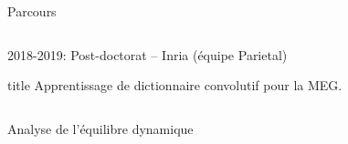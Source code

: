 \documentclass{beamer}
\begin{document}
\begin{frame}[t]{Parcours}
\begin{columns}[c]
\begin{list}{}{\leftmargin=0em \itemsep=1em}
\begin{columns}[T]
        \end{columns}
        
        \item 2018-2019: Post-doctorat -- Inria (équipe Parietal)
        \begin{beamercolorbox}[rounded=true, shadow=true]{title}
            Apprentissage de dictionnaire convolutif pour la MEG.\\
        \end{beamercolorbox}
    \end{list}
\end{columns}

\end{frame}


\begin{frame}{Analyse de l'équilibre dynamique}


\end{frame}
\end{document}
